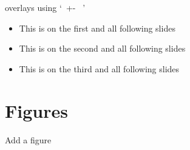 \documentclass[12pt, aspectratio=169, xcolor=pdftex]{beamer}
\begin{document}
\begin{frame}{overlays using \lq\ +- \ \rq}
  \begin{itemize} %
    \item<+-> This is on the first and all following slides
    \item<+-> This is on the second and all following slides
    \item<+-> This is on the third and all following slides
 \end{itemize}
\end{frame}

\section{Figures}
\begin{frame}{Add a figure}
\end{frame}
\end{document}
